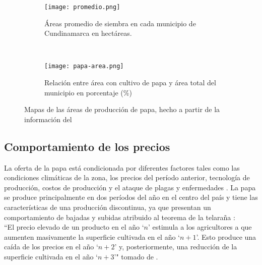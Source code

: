 \begin{figure}[H]
	\begin{center}
		\begin{subfigure}[normla]{0.4\textwidth}
	\texttt{[image: promedio.png]}
		\caption{Áreas promedio de siembra en cada municipio de Cundinamarca en hectáreas.}
		\label{subfig:a1}
		\end{subfigure}
		~
				\begin{subfigure}[normla]{0.4\textwidth}
	\texttt{[image: papa-area.png]}
		\caption{Relación entre área con cultivo de papa y área total del municipio en porcentaje (\%)}
		\label{subfig:a2}
		\end{subfigure}

	\end{center}
	\caption{Mapas de las áreas de producción de papa, hecho a partir de la información del \citet{madr2017}}
	\label{gra:areas_promedio}	
\end{figure}


\subsection{Comportamiento de los precios}

La oferta de la papa está condicionada por diferentes factores tales como las condiciones climáticas de la zona, los precios del período anterior, tecnología de producción, costos de producción y el ataque de plagas y enfermedades \citep{Barrientos2014}. La papa se produce principalmente en dos períodos del año en el centro del país y tiene las características de una producción discontinua, ya que presentan un comportamiento de bajadas y subidas atribuido al teorema de la telaraña \citep{BarrientosF.2011, Ezekiel1938}:\\


``El precio elevado de un producto en el año `$n$' estimula a los agricultores a que aumenten masivamente la superficie cultivada en el año `$n+1$'. Esto produce una caída de los precios en el año `$n+2$' y, posteriormente, una reducción de la superficie cultivada en el año `$n+3$'" tomado de \citet{Cartay1999}.\\



